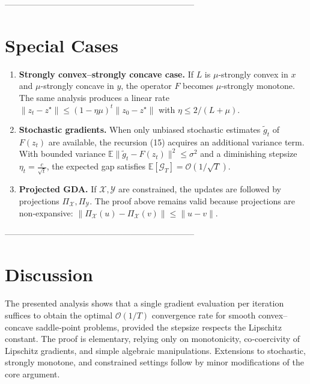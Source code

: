 \documentclass{article}
\newcommand{\E}{\mathbb{E}}
\newcommand{\norm}[1]{\left\|#1\right\|}
\begin{document}
--------------------------------------------------------------------

\section*{Special Cases}
\begin{enumerate}
\item \textbf{Strongly convex–strongly concave case.}
If \(L\) is \(\mu\)-strongly convex in \(x\) and \(\mu\)-strongly concave in \(y\),
the operator \(F\) becomes \(\mu\)-strongly monotone. The same analysis
produces a linear rate
\(\norm{z_t-z^\star}\le (1-\eta\mu)^t\norm{z_0-z^\star}\) with \(\eta\le 2/(L+\mu)\).

\item \textbf{Stochastic gradients.}
When only unbiased stochastic estimates \(\tilde g_t\) of \(F(z_t)\) are available,
the recursion (15) acquires an additional variance term.
With bounded variance \(\E\|\tilde g_t-F(z_t)\|^2\le\sigma^2\) and a diminishing stepsize
\(\eta_t=\frac{c}{\sqrt{t}}\), the expected gap satisfies
\(\E[\mathcal{G}_T]=\mathcal{O}(1/\sqrt{T})\).

\item \textbf{Projected GDA.}
If \(\mathcal{X},\mathcal{Y}\) are constrained, the updates are followed by
projections \(\Pi_{\mathcal{X}},\Pi_{\mathcal{Y}}\). The proof above
remains valid because projections are non‑expansive:
\(\| \Pi_{\mathcal{X}}(u)-\Pi_{\mathcal{X}}(v)\|\le\|u-v\|\).
\end{enumerate}

--------------------------------------------------------------------

\section*{Discussion}
The presented analysis shows that a single gradient evaluation per iteration
suffices to obtain the optimal \(\mathcal{O}(1/T)\) convergence rate for smooth
convex–concave saddle‑point problems, provided the stepsize respects the
Lipschitz constant. The proof is elementary, relying only on monotonicity,
co‑coercivity of Lipschitz gradients, and simple algebraic manipulations.
Extensions to stochastic, strongly monotone, and constrained settings follow
by minor modifications of the core argument.
\end{document}
